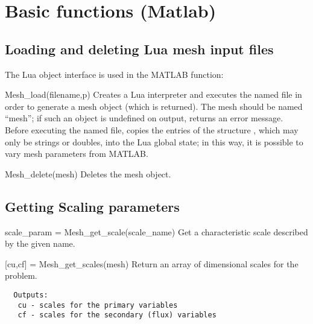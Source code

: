 \newpage
\section{Basic functions (Matlab)}

\subsection{Loading and deleting Lua mesh input files}
The Lua object interface is used in the MATLAB 
function:
\begin{codelist}

  \item[Mesh\_load(filename,p)]
    Creates a Lua interpreter and executes the named file in order to
    generate a mesh object (which is returned).  The mesh should be
    named ``mesh''; if such an object is undefined on output,
     returns an error message.  Before executing
    the named file,  copies the entries of the
    structure , which may only be strings or doubles, into
    the Lua global state; in this way, it is possible to vary mesh
    parameters from MATLAB.

  \item[Mesh\_delete(mesh)]
    Deletes the mesh object.

\end{codelist}

\subsection{Getting Scaling parameters}
\begin{codelist}

  \item[scale\_param = Mesh\_get\_scale(scale\_name)]
  Get a characteristic scale described by the given name.

  \item[{[cu,cf]} = Mesh\_get\_scales(mesh)]
  Return an array of dimensional scales for the problem.
\begin{verbatim}
  Outputs:
   cu - scales for the primary variables
   cf - scales for the secondary (flux) variables
\end{verbatim}

\end{codelist}

